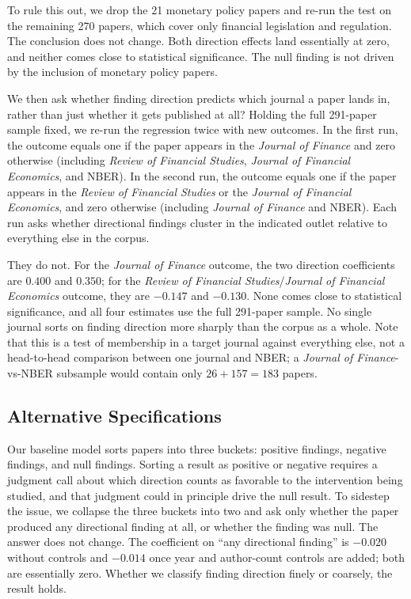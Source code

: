 \documentclass[12pt]{article}
\newcommand{\JF}{\textit{Journal of Finance}}
\newcommand{\RFS}{\textit{Review of Financial Studies}}
\newcommand{\JFE}{\textit{Journal of Financial Economics}}
\begin{document}
To rule this out, we drop the 21 monetary policy papers and re-run
the test on the remaining 270 papers, which cover only financial
legislation and regulation.  The conclusion does not change.  Both
direction effects land essentially at zero, and neither comes close
to statistical significance.  The null finding is not driven by the
inclusion of monetary policy papers.

We then ask whether finding direction predicts which journal a paper
lands in, rather than just whether it
gets published at all?  Holding the full 291-paper sample fixed, we
re-run the regression twice with new outcomes.  In the first run,
the outcome equals one if the paper appears in the \JF{} and zero
otherwise (including \RFS{}, \JFE{}, and NBER).  In the second run,
the outcome equals one if the paper appears in the \RFS{} or the
\JFE{}, and zero otherwise (including \JF{} and NBER).  Each run
asks whether directional findings cluster in the indicated outlet
relative to everything else in the corpus.

They do not.  For the \JF{} outcome, the two direction coefficients
are $0.400$ and $0.350$; for the \RFS{}/\JFE{} outcome, they are
$-0.147$ and $-0.130$.  None comes close to statistical significance,
and all four estimates use the full 291-paper sample.  No single
journal sorts on finding direction more sharply than the corpus as a
whole.  Note that this is a test of membership in a target journal
against everything else, not a head-to-head comparison between one
journal and NBER; a \JF{}-vs-NBER subsample would contain only
$26 + 157 = 183$ papers.

\subsection{Alternative Specifications}
\label{subsec:alt_spec}

Our baseline model sorts papers into three buckets: positive findings,
negative findings, and null findings.  Sorting a result as positive or
negative requires a judgment call about which direction counts as
favorable to the intervention being studied, and that judgment could
in principle drive the null result.  To sidestep the issue, we
collapse the three buckets into two and ask only whether the paper
produced any directional finding at all, or whether the finding was
null.  The answer does not change.  The coefficient on ``any
directional finding'' is $-0.020$ without controls and $-0.014$ once
year and author-count controls are added; both are essentially zero.
Whether we classify finding direction finely or coarsely, the result
holds.
\end{document}
